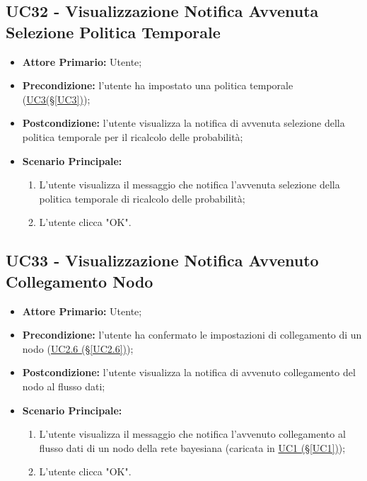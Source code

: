 \subsection{UC32 - Visualizzazione Notifica Avvenuta Selezione Politica Temporale}\label{UC32}

\begin{itemize}
	\item \textbf{Attore Primario:} Utente;
	\item \textbf{Precondizione:} l'utente ha impostato una politica temporale (\hyperref[UC3]{UC3(§\ref*{UC3})});
	\item \textbf{Postcondizione:} l'utente visualizza la notifica di avvenuta selezione della politica temporale per il ricalcolo delle probabilità;
	\item \textbf{Scenario Principale:}
	\begin{enumerate}
		\item L'utente visualizza il messaggio che notifica l'avvenuta selezione della politica temporale di ricalcolo delle probabilità;
		\item L'utente clicca "OK".
	\end{enumerate}
\end{itemize}

\pagebreak

\subsection{UC33 - Visualizzazione Notifica Avvenuto Collegamento Nodo}\label{UC33}

\begin{itemize}
	\item \textbf{Attore Primario:} Utente;
	\item \textbf{Precondizione:} l'utente ha confermato le impostazioni di collegamento di un nodo (\hyperref[UC2.6]{UC2.6 (§\ref*{UC2.6})});
	\item \textbf{Postcondizione:} l'utente visualizza la notifica di avvenuto collegamento del nodo al flusso dati;
	\item \textbf{Scenario Principale:}
	\begin{enumerate}
		\item L'utente visualizza il messaggio che notifica l'avvenuto collegamento al flusso dati di un nodo della rete bayesiana (caricata in \hyperref[UC1]{UC1 (§\ref*{UC1})});
		\item L'utente clicca "OK".
	\end{enumerate}
\end{itemize}

